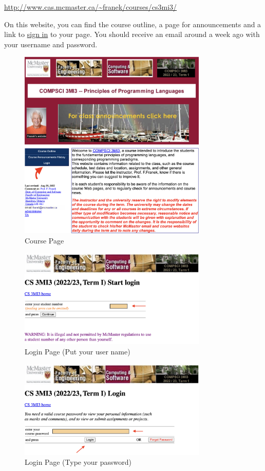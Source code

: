\documentclass[11pt]{article}
\begin{document}
\href{http://www.cas.mcmaster.ca/\~franek/courses/cs3mi3/}{http://www.cas.mcmaster.ca/\textasciitilde{}franek/courses/cs3mi3/}

On this website, you can find the course outline, a page for
announcements and a link to \href{http://www.cas.mcmaster.ca/\~franek/courses/cs3mi3/login/startlogin.cgi}{sign in} to your page. You should receive an
email around a week ago with your username and password.

\begin{figure}[!ht]
\centering
\includegraphics[width=0.8\textwidth]{./figures/1.png}
\caption{\label{fig1}Course Page}
\end{figure}

\begin{figure}[!ht]
\centering
\includegraphics[width=0.8\textwidth]{./figures/2.png}
\caption{\label{fig2}Login Page (Put your user name)}
\end{figure}

\begin{figure}[!ht]
\centering
\includegraphics[width=0.8\textwidth]{./figures/3.png}
\caption{\label{fig3}Login Page (Type your password)}
\end{figure}
\end{document}

